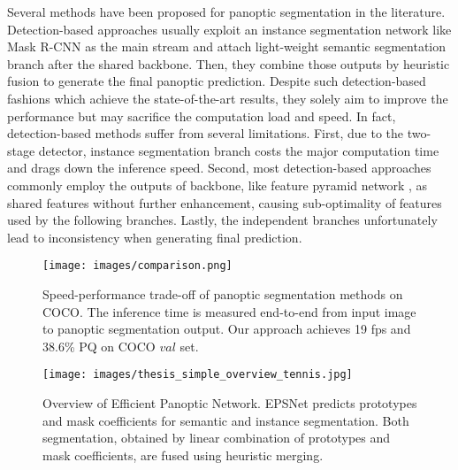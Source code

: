 \documentclass[runningheads]{llncs}
\begin{document}
Several methods \cite{Xiong2019,Sofiiuk2019,Yang2019a,Liu2019,Li2018c,DeGeus2018a} have been proposed for panoptic segmentation in the literature. Detection-based approaches \cite{Xiong2019,Liu2019,Li2018c,DeGeus2018a} usually exploit an instance segmentation network like Mask R-CNN \cite{He2017} as the main stream and attach light-weight semantic segmentation branch after the shared backbone. Then, they combine those outputs by heuristic fusion \cite{Li2018} to generate the final panoptic prediction. Despite such detection-based fashions which achieve the state-of-the-art results, they solely aim to improve the performance but may sacrifice the computation load and speed. In fact, detection-based methods suffer from several limitations. First, due to the two-stage detector, instance segmentation branch costs the major computation time and drags down the inference speed. Second, most detection-based approaches commonly employ the outputs of backbone, like feature pyramid network \cite{Lin2017}, as shared features without further enhancement, causing sub-optimality of features used by the following branches.
Lastly, the independent branches unfortunately lead to inconsistency when generating final prediction.
\begin{figure}[t]
    \begin{minipage}{0.45\textwidth}
    \texttt{[image: images/comparison.png]}
    \caption{Speed-performance trade-off of panoptic segmentation methods on COCO. The inference time is measured end-to-end from input image to panoptic segmentation output. Our approach achieves 19 fps and 38.6\% PQ on COCO $val$ set. }
    \label{fig:sp_tradeoff}
    \end{minipage}
    \hspace{.02\textwidth}
    \begin{minipage}{0.5\textwidth}
    \texttt{[image: images/thesis\_simple\_overview\_tennis.jpg]}
    \caption{Overview of Efficient Panoptic Network. EPSNet predicts prototypes and mask coefficients for semantic and instance segmentation. Both segmentation, obtained by linear combination of prototypes and mask coefficients, are fused using heuristic merging. }
    \label{fig:simple_overview}
    \end{minipage}
\end{figure}
\end{document}
